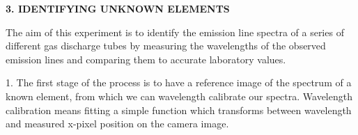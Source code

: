 \documentclass[12pt]{article}
\begin{document}






\bigskip

\bigskip
{\bf 3. IDENTIFYING UNKNOWN ELEMENTS}

\noindent
The aim of this experiment is to identify the emission line spectra of
a series of different gas discharge tubes by measuring the wavelengths of the
observed emission lines and comparing them to accurate laboratory values.

1. The first stage of the process is to have a reference image of the
   spectrum of a known element, from which we can wavelength calibrate
   our spectra. Wavelength calibration means fitting a simple
   function which transforms between wavelength and measured x-pixel 
   position on the camera image.
\end{document}
